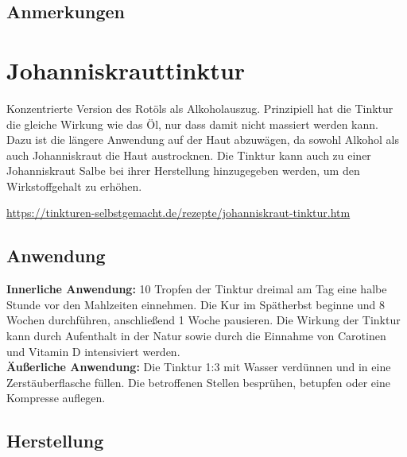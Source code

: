 \subsection{Anmerkungen}



\newpage



\section{Johanniskrauttinktur}

Konzentrierte Version des Rotöls als Alkoholauszug. Prinzipiell hat die Tinktur die gleiche Wirkung wie das Öl, nur dass damit nicht massiert werden kann. Dazu ist die längere Anwendung auf der Haut abzuwägen, da sowohl Alkohol als auch Johanniskraut die Haut austrocknen. Die Tinktur kann auch zu einer Johanniskraut Salbe bei ihrer Herstellung hinzugegeben werden, um den Wirkstoffgehalt zu erhöhen.

\cite{tinkturen} \cite{nedoma2018heiltinkturen}

\url{https://tinkturen-selbstgemacht.de/rezepte/johanniskraut-tinktur.htm}

     
       

\subsection{Anwendung}

\textbf{Innerliche Anwendung:} 10 Tropfen der Tinktur dreimal am Tag eine halbe Stunde vor den Mahlzeiten einnehmen. Die Kur im Spätherbst beginne und 8 Wochen durchführen, anschließend 1 Woche pausieren. Die Wirkung der Tinktur kann durch Aufenthalt in der Natur sowie durch die Einnahme von Carotinen und Vitamin D intensiviert werden.\\

\textbf{Äußerliche Anwendung:} Die Tinktur 1:3 mit Wasser verdünnen und in eine Zerstäuberflasche füllen. Die betroffenen Stellen besprühen, betupfen oder eine Kompresse auflegen.\\

\subsection{Herstellung}


